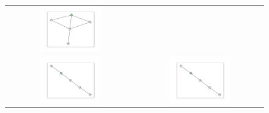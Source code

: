 \documentclass[12pt, a4paper]{extarticle}
\begin{document}
\begin{figure}
\begin{tabularx}{\textwidth}{cc}
\includegraphics[width=0.5\textwidth]{task11-graphlets/5_16-21-25-23-24.pdf} \\
\includegraphics[width=0.5\textwidth]{task11-graphlets/5_14-13-21-18-23.pdf} &
\includegraphics[width=0.5\textwidth]{task11-graphlets/5_14-16-18-23-24.pdf} \\
\end{tabularx}\end{figure}
\end{document}
